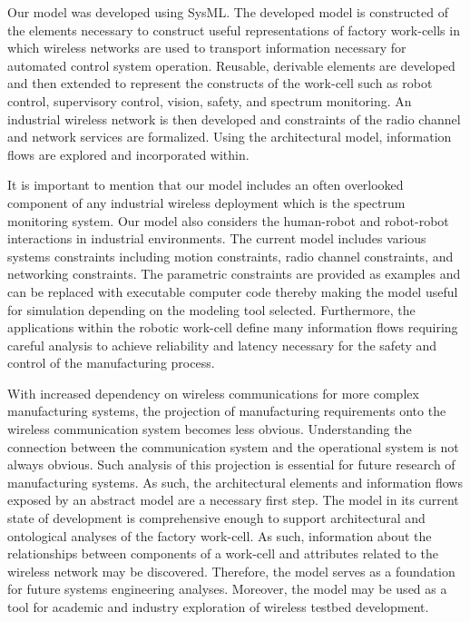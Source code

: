 Our model was developed using SysML. The developed model is constructed of the elements necessary to construct useful representations of factory work-cells in which wireless networks are used to transport information necessary for automated control system operation.  Reusable, derivable elements are developed and then extended to represent the constructs of the work-cell such as robot control, supervisory control, vision, safety, and spectrum monitoring.  An industrial wireless network is then developed and constraints of the radio channel and network services are formalized. Using the architectural model, information flows are explored and incorporated within. 

It is important to mention that our model includes an often overlooked component of any industrial wireless deployment which is the spectrum monitoring system.  Our model also considers the human-robot and robot-robot interactions in industrial environments. The current model includes various systems constraints including motion constraints, radio channel constraints, and networking constraints. The parametric constraints are provided as examples and can be replaced with executable computer code thereby making the model useful for simulation depending on the modeling tool selected. Furthermore, the applications within the robotic work-cell define many information flows requiring careful analysis to achieve reliability and latency necessary for the safety and control of the manufacturing process.

With increased dependency on wireless communications for more complex manufacturing systems, the projection of manufacturing requirements onto the wireless communication system becomes less obvious.  Understanding the connection between the communication system and the operational system is not always obvious. Such analysis of this projection is essential for future research of manufacturing systems. As such, the architectural elements and information flows exposed by an abstract model are a necessary first step. The model in its current state of development is comprehensive enough to support architectural and ontological analyses of the factory work-cell.  As such, information about the relationships between components of a work-cell and attributes related to the wireless network may be discovered. Therefore, the model serves as a foundation for future systems engineering analyses. Moreover, the model may be used as a tool for academic and industry exploration of wireless testbed development.

